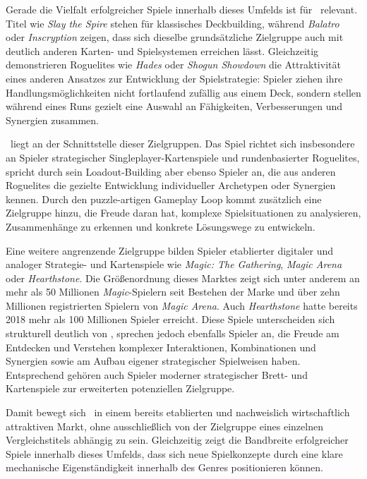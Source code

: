 Gerade die Vielfalt erfolgreicher Spiele innerhalb dieses Umfelds ist für \coc\ relevant.
Titel wie \emph{Slay the Spire} stehen für klassisches Deckbuilding, während \emph{Balatro} oder \emph{Inscryption} zeigen, dass sich dieselbe grundsätzliche Zielgruppe auch mit deutlich anderen Karten- und Spielsystemen erreichen lässt.
Gleichzeitig demonstrieren Roguelites wie \emph{Hades} oder \emph{Shogun Showdown} die Attraktivität eines anderen Ansatzes zur Entwicklung der Spielstrategie: Spieler ziehen ihre Handlungsmöglichkeiten nicht fortlaufend zufällig aus einem Deck, sondern stellen während eines Runs gezielt eine Auswahl an Fähigkeiten, Verbesserungen und Synergien zusammen.

\coc\ liegt an der Schnittstelle dieser Zielgruppen.
Das Spiel richtet sich insbesondere an Spieler strategischer Singleplayer-Kartenspiele und rundenbasierter Roguelites, spricht durch sein Loadout-Building aber ebenso Spieler an, die aus anderen Roguelites die gezielte Entwicklung individueller Archetypen oder Synergien kennen.
Durch den puzzle-artigen Gameplay Loop kommt zusätzlich eine Zielgruppe hinzu, die Freude daran hat, komplexe Spielsituationen zu analysieren, Zusammenhänge zu erkennen und konkrete Lösungswege zu entwickeln.

Eine weitere angrenzende Zielgruppe bilden Spieler etablierter digitaler und analoger Strategie- und Kartenspiele wie \emph{Magic: The Gathering}, \emph{Magic Arena} oder \emph{Hearthstone}.
Die Größenordnung dieses Marktes zeigt sich unter anderem an mehr als 50 Millionen \emph{Magic}-Spielern seit Bestehen der Marke und über zehn Millionen registrierten Spielern von \emph{Magic Arena}.
Auch \emph{Hearthstone} hatte bereits 2018 mehr als 100 Millionen Spieler erreicht.
Diese Spiele unterscheiden sich strukturell deutlich von \coc, sprechen jedoch ebenfalls Spieler an, die Freude am Entdecken und Verstehen komplexer Interaktionen, Kombinationen und Synergien sowie am Aufbau eigener strategischer Spielweisen haben.
Entsprechend gehören auch Spieler moderner strategischer Brett- und Kartenspiele zur erweiterten potenziellen Zielgruppe.

Damit bewegt sich \coc\ in einem bereits etablierten und nachweislich wirtschaftlich attraktiven Markt, ohne ausschließlich von der Zielgruppe eines einzelnen Vergleichstitels abhängig zu sein.
Gleichzeitig zeigt die Bandbreite erfolgreicher Spiele innerhalb dieses Umfelds, dass sich neue Spielkonzepte durch eine klare mechanische Eigenständigkeit innerhalb des Genres positionieren können.

